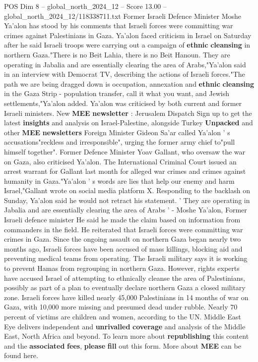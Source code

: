 \begin{textsample}{POS Dim 8 – global\_north\_2024\_12 – Score 13.00 – global\_north\_2024\_12/118338711.txt}  \label{ex:f8_pos_099}
Former Israeli Defence Minister Moshe Ya'alon has stood by his comments that Israeli forces were committing war crimes against Palestinians in Gaza.
Ya'alon faced criticism in Israel on Saturday after he said Israeli troops were carrying out a campaign of \textbf{ethnic} \textbf{cleansing} in northern Gaza."There is no Beit Lahia, there is no Beit Hanoun.
They are operating in Jabalia and are essentially clearing the area of Arabs,"Ya'alon said in an interview with Democrat TV, describing the actions of Israeli forces."The path we are being dragged down is occupation, annexation and \textbf{ethnic} \textbf{cleansing} in the Gaza Strip - population transfer, call it what you want, and Jewish settlements,"Ya'alon added.
Ya'alon was criticised by both current and former Israeli ministers.
New \textbf{MEE} \textbf{newsletter} : Jerusalem Dispatch Sign up to get the latest \textbf{insights} and analysis on Israel-Palestine, alongside Turkey \textbf{Unpacked} and other \textbf{MEE} \textbf{newsletters} Foreign Minister Gideon Sa'ar called Ya'alon ' s accusations"reckless and irresponsible", urging the former army chief to"pull himself together".
Former Defence Minister Yoav Gallant, who oversaw the war on Gaza, also criticised Ya'alon.
The International Criminal Court issued an arrest warrant for Gallant last month for alleged war crimes and crimes against humanity in Gaza."Ya'alon ' s words are lies that help our enemy and harm Israel,"Gallant wrote on social media platform X.
Responding to the backlash on Sunday, Ya'alon said he would not retract his statement. ' They are operating in Jabalia and are essentially clearing the area of Arabs ' - Moshe Ya'alon, Former Israeli defence minister He said he made the claim based on information from commanders in the field.
He reiterated that Israeli forces were committing war crimes in Gaza.
Since the ongoing assault on northern Gaza began nearly two months ago, Israeli forces have been accused of mass killings, blocking aid and preventing medical teams from operating.
The Israeli military says it is working to prevent Hamas from regrouping in northern Gaza.
However, rights experts have accused Israel of attempting to ethnically cleanse the area of Palestinians, possibly as part of a plan to eventually declare northern Gaza a closed military zone.
Israeli forces have killed nearly 45,000 Palestinians in 14 months of war on Gaza, with 10,000 more missing and presumed dead under rubble.
Nearly 70 percent of victims are children and women, according to the UN.
Middle East Eye delivers independent and \textbf{unrivalled} \textbf{coverage} and analysis of the Middle East, North Africa and beyond.
To learn more about \textbf{republishing} this content and the \textbf{associated} \textbf{fees}, \textbf{please} \textbf{fill} out this form.
More about \textbf{MEE} can be found here.

\end{textsample}
